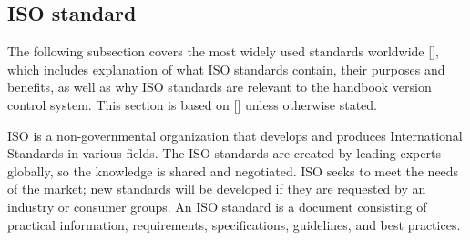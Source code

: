 














\subsection{ISO standard}






The following subsection covers the most widely used standards worldwide [], which includes explanation of what ISO standards contain, their purposes and benefits, as well as why ISO standards are relevant to the handbook version control system. This section is based on [] unless otherwise stated.

ISO is a non-governmental organization that develops and produces International Standards in various fields. The ISO standards are created by leading experts globally, so the knowledge is shared and negotiated. ISO seeks to meet the needs of the market; new standards will be developed if they are requested by an industry or consumer groups. An ISO standard is a document consisting of practical information, requirements, specifications, guidelines, and best practices.

